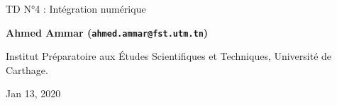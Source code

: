\documentclass[%
oneside,                 %
final,                   %
10pt,french]{article}
\begin{document}

\newcommand{\exercisesection}[1]{\subsection*{#1}}






\thispagestyle{empty}

\begin{center}
{\LARGE\bf
\begin{spacing}{1.25}
TD N°4 : Intégration numérique
\end{spacing}
}
\end{center}


\begin{center}
{\bf Ahmed Ammar (\texttt{ahmed.ammar@fst.utm.tn})}
\end{center}

    \begin{center}
\centerline{{\small Institut Préparatoire aux Études Scientifiques et Techniques, Université de Carthage.}}
\end{center}
    

\begin{center}
Jan 13, 2020
\end{center}

\vspace{1cm}


\tableofcontents


\vspace{1cm} %




\end{document}
